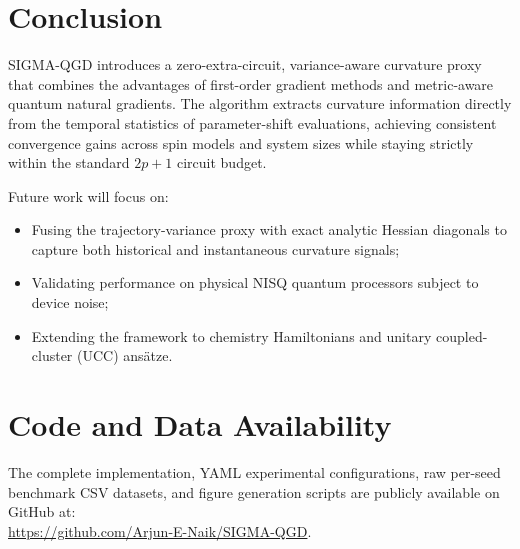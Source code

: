 \documentclass[11pt,a4paper]{article}
\begin{document}
\section{Conclusion}
\label{sec:conclusion}

SIGMA-QGD introduces a zero-extra-circuit, variance-aware curvature proxy that combines the advantages of first-order gradient methods and metric-aware quantum natural gradients. The algorithm extracts curvature information directly from the temporal statistics of parameter-shift evaluations, achieving consistent convergence gains across spin models and system sizes while staying strictly within the standard $2p+1$ circuit budget.

Future work will focus on:
\begin{itemize}
    \item Fusing the trajectory-variance proxy with exact analytic Hessian diagonals to capture both historical and instantaneous curvature signals;
    \item Validating performance on physical NISQ quantum processors subject to device noise;
    \item Extending the framework to chemistry Hamiltonians and unitary coupled-cluster (UCC) ans\"atze.
\end{itemize}

\section*{Code and Data Availability}
The complete implementation, YAML experimental configurations, raw per-seed benchmark CSV datasets, and figure generation scripts are publicly available on GitHub at:\\
\url{https://github.com/Arjun-E-Naik/SIGMA-QGD}.
\end{document}
